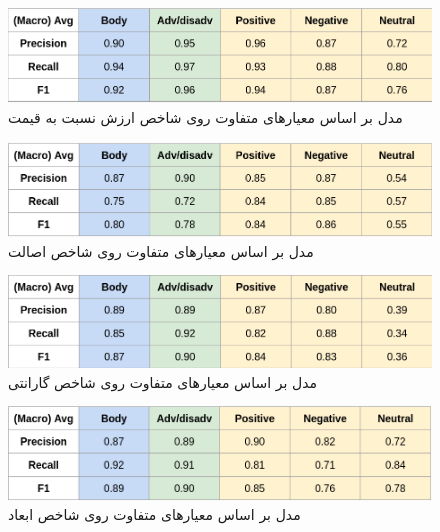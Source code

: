 \begin{figure}[H]
\centering
\includegraphics[width=15cm]{figs/price.png}
\caption{ ‌مدل بر اساس معیارهای متفاوت روی شاخص ارزش نسبت به قیمت}\label{}
\label{fig:test}
\end{figure}



\begin{figure}[H]
\centering
\includegraphics[width=15cm]{figs/fake.png}
\caption{ ‌مدل بر اساس معیارهای متفاوت روی شاخص اصالت}\label{}
\label{fig:test}
\end{figure}




\begin{figure}[H]
\centering
\includegraphics[width=15cm]{figs/warranty.png}
\caption{ ‌مدل بر اساس معیارهای متفاوت روی شاخص گارانتی}\label{}
\label{fig:test}
\end{figure}



\begin{figure}[H]
\centering
\includegraphics[width=15cm]{figs/size.png}
\caption{ ‌مدل بر اساس معیارهای متفاوت روی شاخص ابعاد}\label{}
\label{fig:test}
\end{figure}



